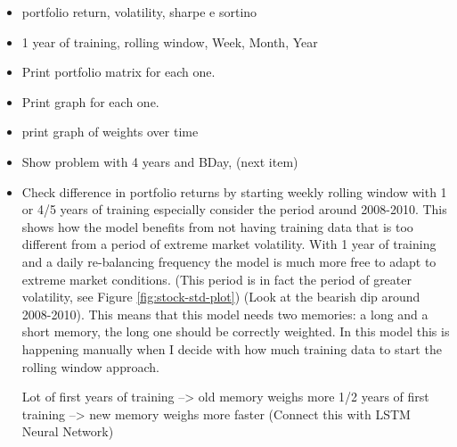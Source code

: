 \begin{itemize}
	\item portfolio return, volatility, sharpe e sortino 
	\item 1 year of training, rolling window, Week, Month, Year
	\item Print portfolio matrix for each one.
	\item Print graph for each one.
	\item print graph of weights over time
	\item Show problem with 4 years and BDay, (next item)
	\item Check difference in portfolio returns by starting weekly rolling window with 1 or 4/5 years of training especially consider the period around 2008-2010. This shows how the model benefits from not having training data that is too different from a period of extreme market volatility. With 1 year of training and a daily re-balancing frequency the model is much more free to adapt to extreme market conditions. (This period is in fact the period of greater volatility, see Figure \ref{fig:stock-std-plot})
	(Look at the bearish dip around 2008-2010). This means that this model needs two memories: a long and a short memory, the long one should be correctly weighted. In this model this is happening manually when I decide with how much training data to start the rolling window approach.
	
	Lot of first years of training --> old memory weighs more
	1/2 years of first training --> new memory weighs more faster
	(Connect this with LSTM Neural Network)
\end{itemize}